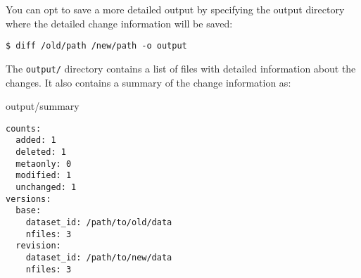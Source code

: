 You can opt to save a more detailed output by specifying the output
directory where the detailed change information will be saved:

\texttt{\$ \appcmd diff /old/path /new/path -o output}

The \texttt{output/} directory contains a list of files with detailed
information about the changes. It also contains a summary of the change
information as:

output/summary

\fi

\begin{lstlisting}
counts:
  added: 1
  deleted: 1
  metaonly: 0
  modified: 1
  unchanged: 1
versions:
  base:
    dataset_id: /path/to/old/data
    nfiles: 3
  revision:
    dataset_id: /path/to/new/data
    nfiles: 3
\end{lstlisting}
